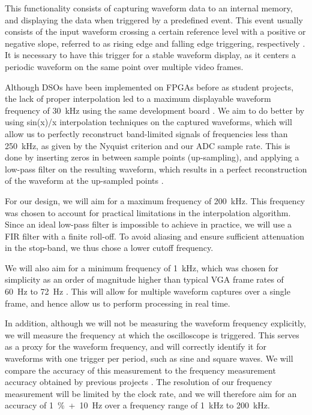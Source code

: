 \documentclass[journal]{IEEEtran}
\begin{document}
This functionality consists of capturing waveform data to an internal memory, and displaying the data when triggered by a predefined event. This event usually consists of the input waveform crossing a certain reference level with a positive or negative slope, referred to as rising edge and falling edge triggering, respectively \cite{tektronix_xyz_2016}. It is necessary to have this trigger for a stable waveform display, as it centers a periodic waveform on the same point over multiple video frames.

Although DSOs have been implemented on FPGAs before as student projects, the lack of proper interpolation led to a maximum displayable waveform frequency of 30~kHz using the same development board \cite{jin_digital_2016}. We aim to do better by using sin(x)/x interpolation techniques on the captured waveforms, which will allow us to perfectly reconstruct band-limited signals of frequencies less than 250~kHz, as given by the Nyquist criterion and our ADC sample rate. This is done by inserting zeros in between sample points (up-sampling), and applying a low-pass filter on the resulting waveform, which results in a perfect reconstruction of the waveform at the up-sampled points \cite{rehorn_sin_2009}.

For our design, we will aim for a maximum frequency of 200~kHz. This frequency was chosen to account for practical limitations in the interpolation algorithm. Since an ideal low-pass filter is impossible to achieve in practice, we will use a FIR filter with a finite roll-off. To avoid aliasing and ensure sufficient attenuation in the stop-band, we thus chose a lower cutoff frequency.

We will also aim for a minimum frequency of 1~kHz, which was chosen for simplicity as an order of magnitude higher than typical VGA frame rates of 60~Hz to 72~Hz \cite{vga_timing}. This will allow for multiple waveform captures over a single frame, and hence allow us to perform processing in real time.

In addition, although we will not be measuring the waveform frequency explicitly, we will measure the frequency at which the oscilloscope is triggered. This serves as a proxy for the waveform frequency, and will correctly identify it for waveforms with one trigger per period, such as sine and square waves. We will compare the accuracy of this measurement to the frequency measurement accuracy obtained by previous projects \cite{jin_digital_2016}. The resolution of our frequency measurement will be limited by the clock rate, and we will therefore aim for an accuracy of 1~\%~+~10~Hz over a frequency range of 1~kHz to 200~kHz.
\end{document}
